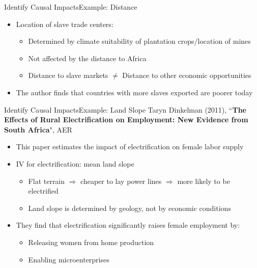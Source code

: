 \documentclass[dvipsnames,hyperref={pdfpagelabels=false}]{beamer}
\begin{document}
\begin{frame}{Identify Causal Impacts}{Example: Distance}	
	\begin{itemize}
		\item Location of slave trade centers:
		\begin{itemize}
			\vspace{0.2cm}
			\item Determined by climate suitability of plantation crops/location of mines
			\vspace{0.2cm}
			\item Not affected by the distance to Africa
			\vspace{0.2cm}
			\item Distance to slave markets $\neq$ Distance to other economic opportunities
			\vspace{0.2cm}
		\end{itemize}
		\item The author finds that countries with more slaves exported are poorer today
	\end{itemize}
\end{frame}





\begin{frame}{Identify Causal Impacts}{Example: Land Slope}
    Taryn Dinkelman (2011), ``\textbf{The Effects of Rural 
    Electrification on Employment: New Evidence from South Africa}", AER
    \begin{itemize}
        \item This paper estimates the impact of electrification 
        on female labor supply
        \vspace{0.2cm}
        \item IV for electrification: mean land slope
        \vspace{0.2cm}
        \begin{itemize}
            \item Flat terrain $\Rightarrow$ cheaper to lay power lines 
            $\Rightarrow$ more likely to be electrified
            \vspace{0.2cm}
            \item Land slope is determined by geology, 
            not by economic conditions
        \end{itemize}
        \vspace{0.2cm}
        \item They find that electrification significantly raises 
        female employment by:
        \begin{itemize}
            \vspace{0.2cm}
            \item Releasing women from home production
            \vspace{0.2cm}
            \item Enabling microenterprises
        \end{itemize}
    \end{itemize}
\end{frame}
\end{document}
